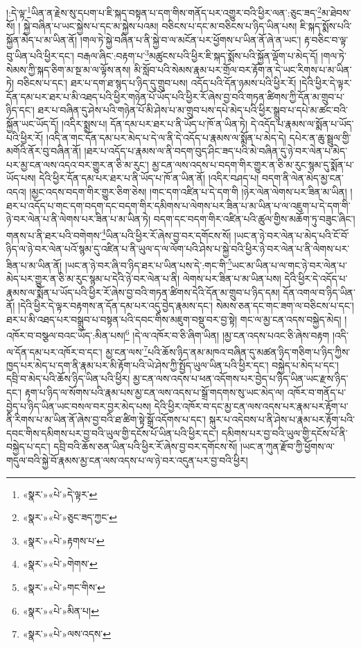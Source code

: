 །:དེ་ལྟ་\footnote{«སྣར་»«པེ་»དེ་ལྟར་}ཡིན་ན་རྗེས་སུ་དཔག་པ་ཇི་སྐད་བསྟན་པ་དག་གིས་གནོད་པར་འགྱུར་བའི་ཕྱིར་ལན་:ཅུང་ཟད་\footnote{«སྣར་»«པེ་»ཅུང་ཟད་ཀྱང་}མ་ཐེབས་སོ། །
སྐྱེ་བཞིན་པ་ཡང་སྐྱེས་པ་དང་མ་སྐྱེས་པའམ། བཅིངས་པ་དང་མ་བཅིངས་པ་ཉིད་ཡིན་པས། ཇི་སྐད་སྨོས་པའི་སྐྱོན་མེད་པ་མ་ཡིན་ནོ། །གལ་ཏེ་སྐྱེ་བཞིན་པ་ནི་སྐྱེ་བ་ལ་མངོན་པར་ཕྱོགས་པ་ཡིན་ནོ་ཞེ་ན་ཡང་། རྟ་བཅིང་བ་ལྟ་བུ་ཡིན་པའི་ཕྱིར་དང་། བརྒལ་ཞིང་:བརྟག་པ་\footnote{«སྣར་»«པེ་»རྟགས་པ་}མཚུངས་པའི་ཕྱིར་ཇི་སྐད་སྨོས་པའི་སྐྱོན་ལྡོག་པ་མེད་དོ། །གལ་ཏེ་སེམས་ཀྱི་སྐད་ཅིག་མ་སྔ་མ་ལ་ལྟོས་ནས། མི་སློབ་པའི་སེམས་རྣམ་པར་གྲོལ་བར་རྟོག་ན་དེ་ཡང་རིགས་པ་མ་ཡིན་ཏེ། བཅིངས་པ་དང་། ཐར་པ་དག་ཐ་སྙད་པ་ཉིད་དུ་གྲུབ་པས། འདོད་པའི་དོན་ཉམས་པའི་ཕྱིར་རོ། །དེའི་ཕྱིར་དེ་ལྟར་དོན་དམ་པར་ཐར་པ་མི་འཐད་པའི་ཕྱིར་གཉེན་པོ་ཡོད་པའི་ཕྱིར་རོ་ཞེས་བྱ་བའི་གཏན་ཚིགས་ཀྱི་དོན་མ་གྲུབ་པ་ཉིད་དང་། ཐར་པ་བཞིན་དུ་ཤེས་པའི་གཉེན་པོ་མི་ཤེས་པ་མ་གྲུབ་པས་དཔེ་མེད་པའི་ཕྱིར་སྒྲུབ་པ་དཔེ་མ་ཚང་བའི་སྐྱོན་ཡང་ཡོད་དོ། །འདིར་སྨྲས་པ། དོན་དམ་པར་ཐར་པ་ནི་ཡོད་པ་ཁོ་ན་ཡིན་ཏེ། དེ་འདོད་པ་རྣམས་ལ་སྨོན་པ་ཡོད་པའི་ཕྱིར་རོ། །འདི་ན་གང་དོན་དམ་པར་མེད་པ་དེ་ལ་ནི་དེ་འདོད་པ་རྣམས་ལ་སྨོན་པ་མེད་དེ། དཔེར་ན་ཆུ་སྦྲུལ་གྱི་མགོའི་ནོར་བུ་བཞིན་ནོ། །ཐར་པ་འདོད་པ་རྣམས་ལ་ནི་བདག་བུད་ཤིང་ཟད་པའི་མེ་བཞིན་དུ་ཉེ་བར་ལེན་པ་མེད་པར་མྱ་ངན་ལས་འདའ་བར་གྱུར་ན་ཅི་མ་རུང་། མྱ་ངན་ལས་འདས་པ་བདག་གིར་གྱུར་ན་ཅི་མ་རུང་སྙམ་དུ་སྨོན་པ་ཡོད་པས། དེའི་ཕྱིར་དོན་དམ་པར་ཐར་པ་ནི་ཡོད་པ་ཁོ་ན་ཡིན་ནོ། །འདིར་བཤད་པ། བདག་ནི་ལེན་མེད་མྱ་ངན་འདའ། །མྱང་འདས་བདག་གིར་གྱུར་ཅིག་ཅེས། །གང་དག་འཛིན་པ་དེ་དག་གི །ཉེར་ལེན་ལེགས་པར་ཟིན་མ་ཡིན། །ཐར་པ་འདོད་པ་གང་དག་བདག་དང་བདག་གིར་དམིགས་པ་ལེགས་པར་ཟིན་པ་མ་ཡིན་པ་ལ་འཇུག་པ་དེ་དག་གི་ཉེ་བར་ལེན་པ་ནི་ལེགས་པར་ཟིན་པ་མ་ཡིན་ཏེ། བདག་དང་བདག་གིར་འཛིན་པའི་ཚུལ་གྱིས་མཆོག་ཏུ་བཟུང་ཞིང་། གནས་པ་ནི་ཐར་པའི་བགེགས་\footnote{«སྣར་»«པེ་»གེགས་}ཡིན་པའི་ཕྱིར་རོ་ཞེས་བྱ་བར་དགོངས་སོ། །ཡང་ན་ཉེ་བར་ལེན་པ་མེད་པའི་ངོ་བོ་ཉིད་ལ་ཉེ་བར་ལེན་པའོ་སྙམ་དུ་འཛིན་པ་ནི་ཡུལ་ད་ལ་ལོག་པའི་ཤེས་པ་སྐྱེ་བའི་ཕྱིར་ཉེ་བར་ལེན་པ་ནི་ལེགས་པར་ཟིན་པ་མ་ཡིན་ནོ། །ཡང་ན་ཉེ་བར་ཞི་བ་ཉིད་ཐར་པ་ཡིན་པས་དེ་:གང་གི་\footnote{«སྣར་»«པེ་»གང་གིས་}ཡང་མ་ཡིན་པ་ལ་གང་ཉེ་བར་ལེན་པ་མེད་པར་གྱུར་ན་ཅི་མ་རུང་སྙམ་པ་དེའི་ཉེ་བར་ལེན་པ་ནི། ལེགས་པར་ཟིན་པ་མ་ཡིན་པས། དེའི་ཕྱིར་དེ་འདོད་པ་རྣམས་ལ་སྨོན་པ་ཡོད་པའི་ཕྱིར་རོ་ཞེས་བྱ་བའི་གཏན་ཚིགས་དེའི་དོན་མ་གྲུབ་པ་ཉིད་དམ། དོན་འགལ་བ་ཉིད་ཡིན་ནོ། །དེའི་ཕྱིར་དེ་ལྟར་བརྟགས་ན་དོན་དམ་པར་འདུ་བྱེད་རྣམས་དང་། སེམས་ཅན་དང་གང་ཟག་ལ་བཅིངས་པ་དང་། ཐར་པ་མི་འཐད་པར་བསྒྲུབ་པ་བསྟན་པའི་དབང་གིས་མཇུག་བསྡུ་བར་བྱ་སྟེ། གང་ལ་མྱ་ངན་འདས་བསྐྱེད་མེད། །འཁོར་བ་བསྩལ་བའང་ཡོད་:མིན་པས།\footnote{«སྣར་»«པེ་»མིན་པ།} །དེ་ལ་འཁོར་བ་ཅི་ཞིག་ཡིན། །མྱ་ངན་འདས་པའང་ཅི་ཞེས་བརྟག །འདི་ལ་དོན་དམ་པར་འཁོར་བ་དང་། མྱ་ངན་ལས་\footnote{«སྣར་»«པེ་»ལས་འདས་}པའི་ཆོས་ཉིད་ནམ་མཁའ་བཞིན་དུ་མཚན་ཉིད་གཅིག་པ་ཉིད་ཀྱིས་ཁྱད་པར་མེད་པ་དག་ནི་རྣམ་པར་མི་རྟོག་པའི་ཡེ་ཤེས་ཀྱི་སྤྱོད་ཡུལ་ཡིན་པའི་ཕྱིར་དང་། བསྐྱེད་པ་མེད་པ་དང་། དབྲི་བ་མེད་པའི་ཆོས་ཉིད་ཡིན་པའི་ཕྱིར། མྱ་ངན་ལས་འདས་པ་ཕན་འདོགས་པར་བྱེད་པ་ཉིད་ཡིན་ཡང་རྫས་ཉིད་དང་། རྟག་པ་ཉིད་ལ་སོགས་པའི་རྣམ་པས་མྱ་ངན་ལས་འདས་པ་སྒྲོ་གདགས་སུ་ཡང་མེད་ལ། འཁོར་བ་གནོད་པ་བྱེད་པ་ཉིད་ཡིན་ཡང་བསལ་བར་བྱར་མེད་པས། དེའི་ཕྱིར་འཁོར་བ་དང་མྱ་ངན་ལས་འདས་པར་རྣམ་པར་རྟོག་པ་ནི་རིགས་པ་མ་ཡིན་ནོ་ཞེས་བྱ་བའི་ཐ་ཚིག་སྟེ་སྒྲོ་འདོགས་པ་དང་། སྐུར་པ་འདེབས་པ་ནི་ཤེས་པ་རྣམ་པར་རྟོག་པའི་དབང་གིས་དམིགས་པར་བྱ་བའི་ཡུལ་གྱི་དངོས་པོ་ཡིན་པའི་ཕྱིར་དང་། དམིགས་པར་བྱ་བའི་ཡུལ་གྱི་དངོས་པོ་ནི་བསྐྱེད་པ་དང་། དབྲི་བའི་ཆོས་ཅན་ཡིན་པའི་ཕྱིར་རོ་ཞེས་བྱ་བར་དགོངས་སོ། །ཡང་ན་ཀུན་རྫོབ་ཀྱི་ཕྱོགས་ལ་གདུལ་བའི་སྐྱེ་བོ་རྣམས་མྱ་ངན་ལས་འདས་པ་ལ་ཉེ་བར་འདུན་པར་བྱ་བའི་ཕྱིར། 
